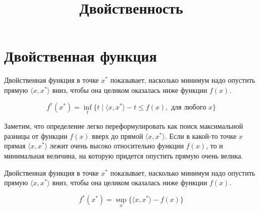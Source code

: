 \documentclass[
  letterpaper,
  DIV=11,
  numbers=noendperiod]{scrartcl}
\title{Двойственность}
\author{}
\date{}
\renewcommand*\contentsname{Содержание}
\newcommand\contentsname{Содержание}
\begin{document}
\maketitle

\renewcommand*\contentsname{Содержание}
{
\hypersetup{linkcolor=}
\setcounter{tocdepth}{2}
\tableofcontents
}
\section{Двойственная
функция}\label{ux434ux432ux43eux439ux441ux442ux432ux435ux43dux43dux430ux44f-ux444ux443ux43dux43aux446ux438ux44f}

\begin{tcolorbox}[enhanced jigsaw, breakable, opacityback=0, title=\textcolor{quarto-callout-note-color}{\faInfo}\hspace{0.5em}{Двойственная функция}, opacitybacktitle=0.6, toptitle=1mm, bottomtitle=1mm, colframe=quarto-callout-note-color-frame, leftrule=.75mm, colback=white, titlerule=0mm, rightrule=.15mm, arc=.35mm, coltitle=black, colbacktitle=quarto-callout-note-color!10!white, toprule=.15mm, bottomrule=.15mm, left=2mm]

Двойственная функция в точке \(x^*\) показывает, насколько минимум надо
опустить прямую \(\langle x, x^* \rangle\) вниз, чтобы она целиком
оказалась ниже функции \(f(x)\).

\[
f^*(x^*) = \inf_t \{t \mid \langle x, x^* \rangle - t \leq f(x), \text{ для любого } x\}
\]

\end{tcolorbox}

Заметим, что определение легко переформулировать как поиск максимальной
разницы от функции \(f(x)\) вверх до прямой \(\langle x, x^* \rangle\).
Если в какой-то точке \(x\) прямая \(\langle x, x^* \rangle\) лежит
очень высоко относительно функции \(f(x)\), то и минимальная величина,
на которую придется опустить прямую очень велика.

\begin{tcolorbox}[enhanced jigsaw, breakable, opacityback=0, title=\textcolor{quarto-callout-note-color}{\faInfo}\hspace{0.5em}{Двойственная функция}, opacitybacktitle=0.6, toptitle=1mm, bottomtitle=1mm, colframe=quarto-callout-note-color-frame, leftrule=.75mm, colback=white, titlerule=0mm, rightrule=.15mm, arc=.35mm, coltitle=black, colbacktitle=quarto-callout-note-color!10!white, toprule=.15mm, bottomrule=.15mm, left=2mm]

Двойственная функция в точке \(x^*\) показывает, насколько минимум надо
опустить прямую \(\langle x, x^* \rangle\) вниз, чтобы она целиком
оказалась ниже функции \(f(x)\).

\[
f^*(x^*) = \sup_x \{\langle x, x^* \rangle - f(x)\}
\]

\end{tcolorbox}
\end{document}
